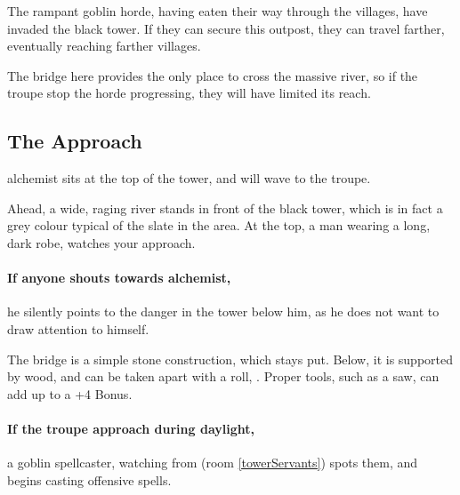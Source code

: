 \begin{multicols}{2}


\begin{exampletext}
  \noindent
  The rampant goblin horde, having eaten their way through the villages, have invaded the black tower.
  If they can secure this outpost, they can travel farther, eventually reaching farther villages.

  The bridge here provides the only place to cross the massive river, so if the troupe stop the horde progressing, they will have limited its reach.
\end{exampletext}

\subsection{The Approach}

\Gls{alchemist} sits at the top of the tower, and will wave to the troupe.

\begin{boxtext}

  Ahead, a wide, raging river stands in front of the black tower, which is in fact a grey colour typical of the slate in the area.
  At the top, a man wearing a long, dark robe, watches your approach.

\end{boxtext}

\paragraph{If anyone shouts towards \gls{alchemist},}
he silently points to the danger in the tower below him, as he does not want to draw attention to himself.


The bridge is a simple stone construction, which stays put.
Below, it is supported by wood, and can be taken apart with a  roll, \tn[14].
Proper tools, such as a saw, can add up to a +4 Bonus.

\paragraph{If the troupe approach during daylight,}
a goblin spellcaster, watching from  (room \ref{towerServants}) spots them, and begins casting offensive spells.


\end{multicols}
